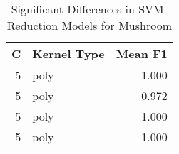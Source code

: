 \begin{table}
\centering
\caption{Significant Differences in SVM-Reduction Models for Mushroom}
\label{tab:svm_reduction_significant_pairs_mushroom}
\begin{tabular}{rlr}
\toprule
C & Kernel Type & Mean F1 \\
\midrule
5 & poly & 1.000 \\
5 & poly & 0.972 \\
5 & poly & 1.000 \\
5 & poly & 1.000 \\
\bottomrule
\end{tabular}
\end{table}
